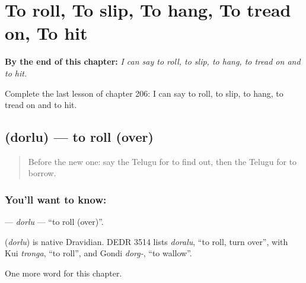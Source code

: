 
\chapter{To roll, To slip, To hang, To tread on, To hit}
\label{ch:te-to-roll-to-slip-to-hang-to-tread-on-to-hit}

\begin{chapteropening}
\textbf{By the end of this chapter:} \emph{I can say to roll, to slip, to hang, to tread on and to hit.}

Complete the last lesson of chapter 206: I can say to roll, to slip, to hang, to tread on and to hit.
\end{chapteropening}

\section[\texorpdfstring{\te{దొర్లు} (dorlu)}{దొర్లు (dorlu)}]{ (dorlu) — to roll (over)}

\label{lesson:TE-C206-dorlu}



\begin{quote}
Before the new one: say the Telugu for to find out, then the Telugu for to borrow.
\end{quote}

\subsection*{You'll want to know: }
\textbf{} — \emph{dorlu} — \textquotedblleft{}to roll (over)\textquotedblright{}.

\begin{cousinweb}
\textbf{} (\emph{dorlu}) is native Dravidian. DEDR 3514 lists \emph{doralu}, \textquotedblleft{}to roll, turn over\textquotedblright{}, with Kui \emph{tronga}, \textquotedblleft{}to roll\textquotedblright{}, and Gondi \emph{dorg-}, \textquotedblleft{}to wallow\textquotedblright{}.
\end{cousinweb}

\begin{grammarlens}[title={What you've built}]
One more word for this chapter.
\end{grammarlens}

